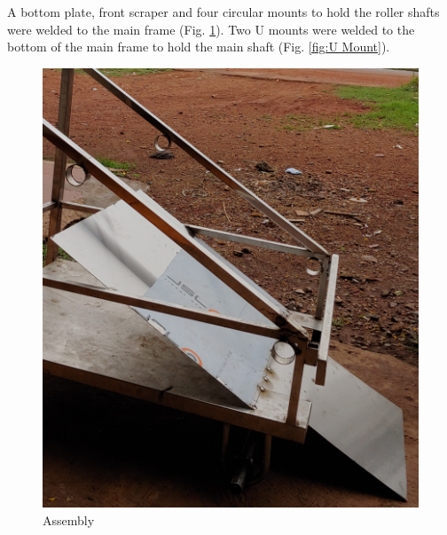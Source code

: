 A bottom plate, front scraper and  four circular mounts to hold the roller shafts were welded to the main frame (Fig. \ref{fig:Assembly}). Two U mounts were welded to the bottom of the main frame to hold the main shaft (Fig. \ref{fig:U Mount}).


\begin{figure}[H]
  \centering
    \begin{minipage}{0.40\textwidth}
    \centering
      \includegraphics[width=1\textwidth]{med ass.jpg}
       \caption{Assembly}
    \label{fig:Assembly}
    \end{minipage}
\hfill
    \begin{minipage}{0.37\textwidth}
    \centering

\end{minipage}
\end{figure}
